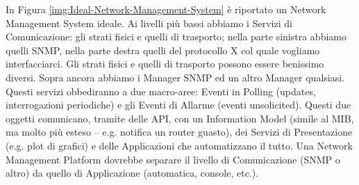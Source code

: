In Figura \ref{img:Ideal-Network-Management-System} è riportato un Network Management System ideale. Ai livelli più bassi abbiamo i Servizi di Comunicazione: gli strati fisici e quelli di trasporto; nella parte sinistra abbiamo quelli SNMP, nella parte destra quelli del protocollo X col quale vogliamo interfacciarci. Gli strati fisici e quelli di trasporto possono essere benissimo diversi. Sopra ancora abbiamo i Manager SNMP ed un altro Manager qualsiasi. Questi servizi obbediranno a due macro-aree: Eventi in Polling (updates, interrogazioni periodiche) e gli Eventi di Allarme (eventi unsolicited). Questi due oggetti comunicano, tramite delle API, con un Information Model (simile al MIB, ma molto più esteso -- e.g. notifica un router guasto), dei Servizi di Presentazione (e.g. plot di grafici) e delle Applicazioni che automatizzano il tutto. Una Network Management Platform dovrebbe separare il livello di Comunicazione (SNMP o altro) da quello di Applicazione (automatica, console, etc.).

